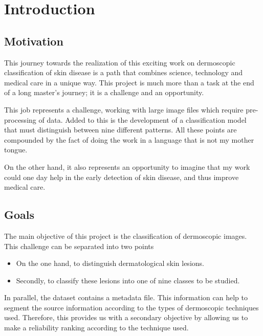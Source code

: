 \chapter{Introduction}
\label{chapter:introduction}


\section{Motivation}

This journey towards the realization of this exciting work on dermoscopic classification of skin disease is a path that combines science, technology and medical care in a unique way. This project is much more than a task at the end of a long master's journey; it is a challenge and an opportunity.

This job represents a challenge, working with large image files which require pre-processing of data. Added to this is the development of a classification model that must distinguish between nine different patterns. All these points are compounded by the fact of doing the work in a language that is not my mother tongue.

On the other hand, it also represents an opportunity to imagine that my work could one day help in the early detection of skin disease, and thus improve medical care.


\section{Goals}


The main objective of this project is the classification of dermoscopic images. This challenge can be separated into two points

\begin{itemize}
    \item On the one hand, to distinguish dermatological skin lesions.
    \item Secondly, to classify these lesions into one of nine classes to be studied.
\end{itemize}

In parallel, the dataset contains a metadata file. This information can help to segment the source information according to the types of dermoscopic techniques used. Therefore, this provides us with a secondary objective by allowing us to make a reliability ranking according to the technique used. 


